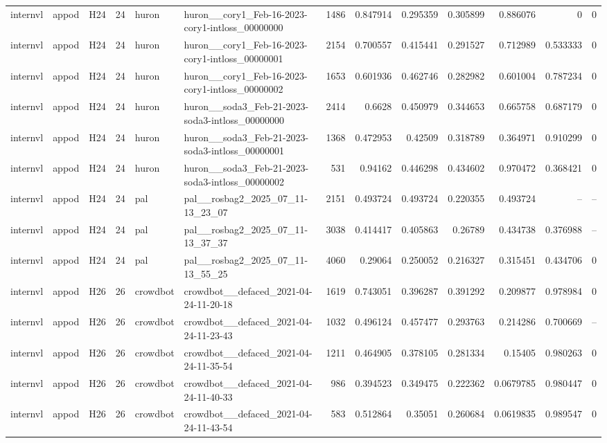 \begin{longtable}{lllrllrrrrrrr}
internvl & appod & H24 & 24 & huron & huron\_\_cory1\_Feb-16-2023-cory1-intloss\_00000000 & 1486 & 0.847914 & 0.295359 & 0.305899 & 0.886076 & 0 & 0 \\
internvl & appod & H24 & 24 & huron & huron\_\_cory1\_Feb-16-2023-cory1-intloss\_00000001 & 2154 & 0.700557 & 0.415441 & 0.291527 & 0.712989 & 0.533333 & 0 \\
internvl & appod & H24 & 24 & huron & huron\_\_cory1\_Feb-16-2023-cory1-intloss\_00000002 & 1653 & 0.601936 & 0.462746 & 0.282982 & 0.601004 & 0.787234 & 0 \\
internvl & appod & H24 & 24 & huron & huron\_\_soda3\_Feb-21-2023-soda3-intloss\_00000000 & 2414 & 0.6628 & 0.450979 & 0.344653 & 0.665758 & 0.687179 & 0 \\
internvl & appod & H24 & 24 & huron & huron\_\_soda3\_Feb-21-2023-soda3-intloss\_00000001 & 1368 & 0.472953 & 0.42509 & 0.318789 & 0.364971 & 0.910299 & 0 \\
internvl & appod & H24 & 24 & huron & huron\_\_soda3\_Feb-21-2023-soda3-intloss\_00000002 & 531 & 0.94162 & 0.446298 & 0.434602 & 0.970472 & 0.368421 & 0 \\
internvl & appod & H24 & 24 & pal & pal\_\_rosbag2\_2025\_07\_11-13\_23\_07 & 2151 & 0.493724 & 0.493724 & 0.220355 & 0.493724 & -- & -- \\
internvl & appod & H24 & 24 & pal & pal\_\_rosbag2\_2025\_07\_11-13\_37\_37 & 3038 & 0.414417 & 0.405863 & 0.26789 & 0.434738 & 0.376988 & -- \\
internvl & appod & H24 & 24 & pal & pal\_\_rosbag2\_2025\_07\_11-13\_55\_25 & 4060 & 0.29064 & 0.250052 & 0.216327 & 0.315451 & 0.434706 & 0 \\
internvl & appod & H26 & 26 & crowdbot & crowdbot\_\_defaced\_2021-04-24-11-20-18 & 1619 & 0.743051 & 0.396287 & 0.391292 & 0.209877 & 0.978984 & 0 \\
internvl & appod & H26 & 26 & crowdbot & crowdbot\_\_defaced\_2021-04-24-11-23-43 & 1032 & 0.496124 & 0.457477 & 0.293763 & 0.214286 & 0.700669 & -- \\
internvl & appod & H26 & 26 & crowdbot & crowdbot\_\_defaced\_2021-04-24-11-35-54 & 1211 & 0.464905 & 0.378105 & 0.281334 & 0.15405 & 0.980263 & 0 \\
internvl & appod & H26 & 26 & crowdbot & crowdbot\_\_defaced\_2021-04-24-11-40-33 & 986 & 0.394523 & 0.349475 & 0.222362 & 0.0679785 & 0.980447 & 0 \\
internvl & appod & H26 & 26 & crowdbot & crowdbot\_\_defaced\_2021-04-24-11-43-54 & 583 & 0.512864 & 0.35051 & 0.260684 & 0.0619835 & 0.989547 & 0 \\

\end{longtable}
